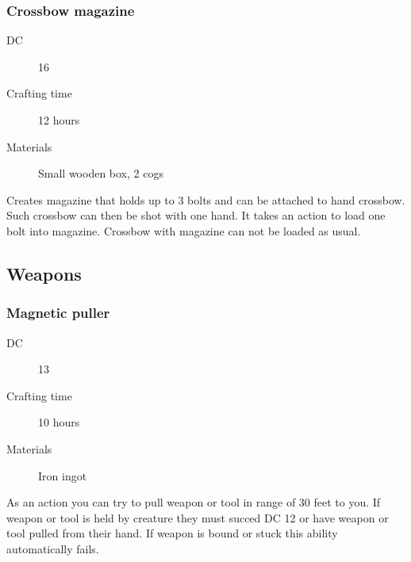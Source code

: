 \subsubsection{Crossbow magazine}

\begin{description}
\item [DC] 16 \sleightofhand
\item [Crafting time] 12 hours
\item [Materials] Small wooden box, 2 cogs
\end{description}

Creates magazine that holds up to 3 bolts and can be attached to hand crossbow. Such crossbow can then be shot with one hand. It takes an action to load one bolt into magazine. Crossbow with magazine can not be loaded as usual.

\subsection{Weapons}

\subsubsection{Magnetic puller}

\begin{description}
\item [DC] 13 \nature
\item [Crafting time] 10 hours
\item [Materials] Iron ingot
\end{description}

As an action you can try to pull weapon or tool in range of 30 feet to you. If weapon or tool is held by creature they must succed DC 12 \strengthsave or have weapon or tool pulled from their hand. If weapon is bound or stuck this ability automatically fails.